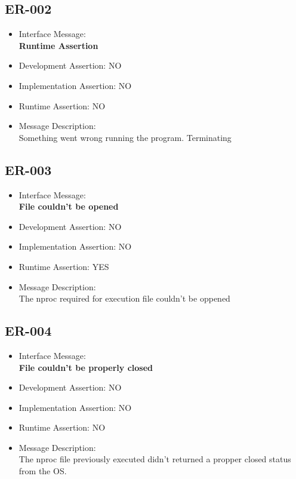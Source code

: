 \subsection{ER-002}
\begin{itemize}
  \item Interface Message:\\[1em]\textbf{Runtime Assertion}
  \item Development Assertion: NO
  \item Implementation Assertion: NO
  \item Runtime Assertion: NO
  \item Message Description:\\[1em]Something went wrong running the program. Terminating
\end{itemize}

\subsection{ER-003}
\begin{itemize}
  \item Interface Message:\\[1em]\textbf{File couldn't be opened}
  \item Development Assertion: NO
  \item Implementation Assertion: NO
  \item Runtime Assertion: YES
  \item Message Description:\\[1em]The nproc required for execution file couldn't be oppened
\end{itemize}

\subsection{ER-004}
\begin{itemize}
  \item Interface Message:\\[1em]\textbf{File couldn't be properly closed}
  \item Development Assertion: NO
  \item Implementation Assertion: NO
  \item Runtime Assertion: NO
  \item Message Description:\\[1em]The nproc file previously executed didn't returned a propper closed status from the OS.
\end{itemize}

